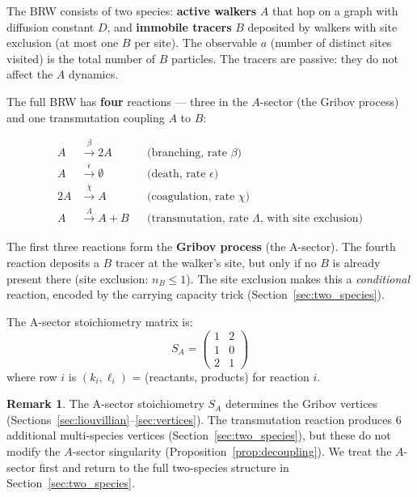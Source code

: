 \documentclass[11pt,a4paper]{article}
\theoremstyle{definition}
\newtheorem*{remark}{Remark}
\begin{document}
The BRW consists of two species: \textbf{active walkers} $A$ that hop on
a graph with diffusion constant $D$, and \textbf{immobile tracers} $B$
deposited by walkers with site exclusion (at most one $B$ per site).
The observable $a$ (number of distinct sites visited) is the total number
of $B$ particles. The tracers are passive: they do not affect the $A$
dynamics.

The full BRW has \textbf{four} reactions --- three in the $A$-sector
(the Gribov process) and one transmutation coupling $A$ to $B$:

\begin{equation}
\boxed{
\begin{aligned}
A &\xrightarrow{\;\beta\;} 2A & &\text{(branching, rate } \beta\text{)} \\[4pt]
A &\xrightarrow{\;\epsilon\;} \emptyset & &\text{(death, rate } \epsilon\text{)} \\[4pt]
2A &\xrightarrow{\;\chi\;} A & &\text{(coagulation, rate } \chi\text{)} \\[4pt]
A &\xrightarrow{\;\Lambda\;} A + B & &\text{(transmutation, rate } \Lambda\text{, with site exclusion)}
\end{aligned}
}
\label{eq:brw_reactions}
\end{equation}

The first three reactions form the \textbf{Gribov process} (the A-sector).
The fourth reaction deposits a $B$ tracer at the walker's site, but only
if no $B$ is already present there (site exclusion: $n_B \leq 1$).
The site exclusion makes this a \emph{conditional} reaction, encoded by
the carrying capacity trick (Section~\ref{sec:two_species}).

The A-sector stoichiometry matrix is:
\begin{equation}
S_A = \begin{pmatrix}
1 & 2 \\
1 & 0 \\
2 & 1
\end{pmatrix}
\label{eq:stoich}
\end{equation}
where row $i$ is $(k_i, \ell_i)$ = (reactants, products) for reaction $i$.

\begin{remark}
The A-sector stoichiometry $S_A$ determines the Gribov vertices
(Sections~\ref{sec:liouvillian}--\ref{sec:vertices}). The transmutation
reaction produces 6 additional multi-species vertices
(Section~\ref{sec:two_species}), but these do not modify the $A$-sector
singularity (Proposition~\ref{prop:decoupling}). We treat the $A$-sector
first and return to the full two-species structure in
Section~\ref{sec:two_species}.
\end{remark}
\end{document}
